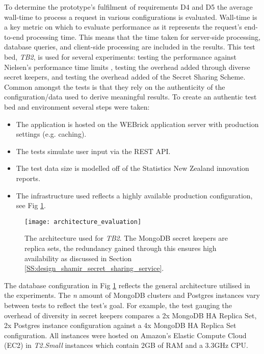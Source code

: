 To determine the prototype's fulfilment of requirements D4 and D5 the average wall-time to process a request in various configurations is evaluated. Wall-time is a key metric on which to evaluate performance as it represents the request's end-to-end processing time. This means that the time taken for server-side processing, database queries, and client-side processing are included in the results. This test bed, \textit{TB2}, is used for several experiments: testing the performance against Nielsen's performance time limits \cite{Responsetime:online}, testing the overhead added through diverse secret keepers, and testing the overhead added of the Secret Sharing Scheme. Common amongst the tests is that they rely on the authenticity of the configuration/data used to derive meaningful results. To create an authentic test bed and environment several steps were taken:
\begin{itemize}  
    \item The application is hosted on the WEBrick application server with production settings (e.g. caching).
    \item The tests simulate user input via the REST API.
    \item The test data size is modelled off of the Statistics New Zealand innovation reports.
    \item The infrastructure used reflects a highly available production configuration, see Fig \ref{fig:architecture_evaluation}.
\end{itemize}

\begin{figure}[ht]
    \centering
    \texttt{[image: architecture\_evaluation]}
    \caption{The architecture used for \textit{TB2}. The MongoDB secret keepers are replica sets, the redundancy gained through this ensures high availability as discussed in Section \ref{SS:design_shamir_secret_sharing_service}.}
    \label{fig:architecture_evaluation}
\end{figure}

The database configuration in Fig \ref{fig:architecture_evaluation} reflects the general architecture utilised in the experiments. The \textit{n} amount of MongoDB clusters and Postgres instances vary between tests to reflect the test's goal. For example, the test gauging the overhead of diversity in secret keepers compares a 2x MongoDB HA Replica Set, 2x Postgres instance configuration against a 4x MongoDB HA Replica Set configuration. All instances were hosted on Amazon's Elastic Compute Cloud (EC2) in \textit{T2.Small} instances which contain 2GB of RAM and a 3.3GHz CPU.

